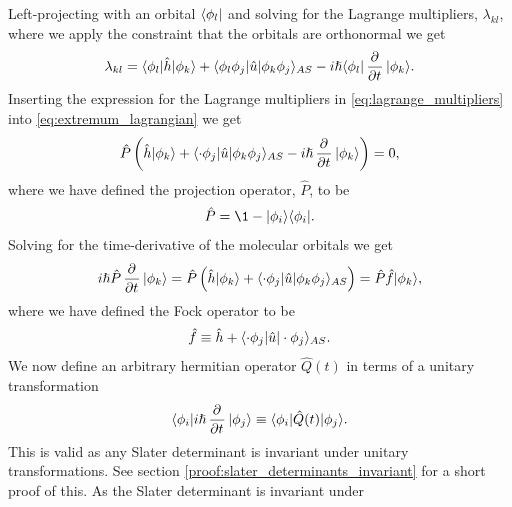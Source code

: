         Left-projecting with an orbital $\langle \phi_l |$ and solving for the
        Lagrange multipliers, $\lambda_{kl}$, where we apply the constraint that
        the orbitals are orthonormal we get
        \begin{align}
            \lambda_{kl}
            =
            \bra{\phi_l}\hat{h}\ket{\phi_k}
            + \bra{\phi_l\phi_j}\hat{u}\ket{\phi_k\phi_j}_{AS}
            - i\hslash\bra{\phi_l}\dpd{}{t}\ket{\phi_k}.
            \label{eq:lagrange_multipliers}
        \end{align}
        Inserting the expression for the Lagrange multipliers in
        \autoref{eq:lagrange_multipliers} into \autoref{eq:extremum_lagrangian}
        we get
        \begin{align}
            \hat{P}\para{
                \hat{h}\ket{\phi_k}
                + \bra{\cdot\phi_j}\hat{u}\ket{\phi_k\phi_j}_{AS}
                - i\hslash\dpd{}{t}\ket{\phi_k}
            } = 0,
        \end{align}
        where we have defined the projection operator, $\hat{P}$, to be
        \begin{align}
            \hat{P} = \1 - \ket{\phi_i}\bra{\phi_i}.
        \end{align}
        Solving for the time-derivative of the molecular orbitals we get
        \begin{align}
            i\hslash\hat{P}\dpd{}{t}\ket{\phi_k}
            = \hat{P}\para{
                \hat{h}\ket{\phi_k}
                + \bra{\cdot\phi_j}\hat{u}\ket{\phi_k\phi_j}_{AS}
            }
            = \hat{P}\hat{f}\ket{\phi_k},
            \label{eq:tdhf_equations_p}
        \end{align}
        where we have defined the Fock operator to be
        \begin{align}
            \hat{f}
            \equiv \hat{h} + \langle \cdot\phi_j |\hat{u}| \cdot\phi_j \rangle_{AS}.
        \end{align}
        We now define an arbitrary hermitian operator $\hat{Q}(t)$ in terms of
        a unitary transformation
        \begin{align}
            \bra{\phi_i}i\hslash\dpd{}{t}\ket{\phi_j}
            \equiv \bra{\phi_i}\hat{Q}(t)\ket{\phi_j}.
            \label{eq:unitary_transformation_time}
        \end{align}
        This is valid as any Slater determinant is invariant under unitary
        transformations. See section \ref{proof:slater_determinants_invariant}
        for a short proof of this. As the Slater determinant is invariant under
